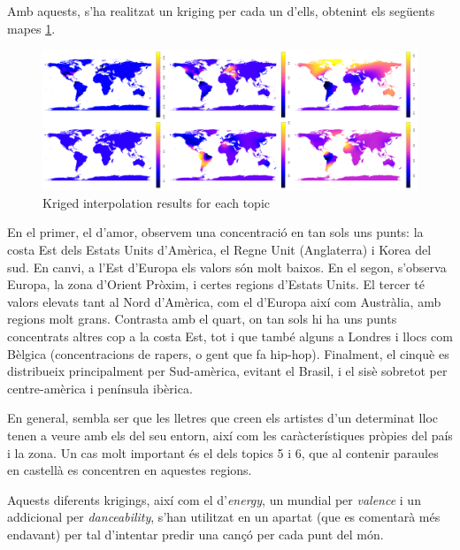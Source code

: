 Amb aquests, s'ha realitzat un kriging per cada un d'ells, obtenint els següents mapes \ref{fig:textual_kriging}.

\begin{figure}[H]
    \centering
    \includegraphics[width=0.75\linewidth]{Images//8_Textual//Geotextual/merged_topics_geotext.png}
    \caption{Kriged interpolation results for each topic}
    \label{fig:textual_kriging}
\end{figure}

En el primer, el d'amor, observem una concentració en tan sols uns punts: la costa Est dels Estats Units d'Amèrica, el Regne Unit (Anglaterra) i Korea del sud. En canvi, a l'Est d'Europa els valors són molt baixos. En el segon, s'observa Europa, la zona d'Orient Pròxim, i certes regions d'Estats Units. El tercer té valors elevats tant al Nord d'Amèrica, com el d'Europa així com Austràlia, amb regions molt grans. Contrasta amb el quart, on tan sols hi ha uns punts concentrats altres cop a la costa Est, tot i que també alguns a Londres i llocs com Bèlgica (concentracions de rapers, o gent que fa hip-hop). Finalment, el cinquè es distribueix principalment per Sud-amèrica, evitant el Brasil, i el sisè sobretot per centre-amèrica i península ibèrica.

En general, sembla ser que les lletres que creen els artistes d'un determinat lloc tenen a veure amb els del seu entorn, així com les caràcterístiques pròpies del país i la zona. Un cas molt important és el dels topics 5 i 6, que al contenir paraules en castellà es concentren en aquestes regions.

Aquests diferents krigings, així com el d'\textit{energy}, un mundial per \textit{valence} i un addicional per \textit{danceability}, s'han utilitzat en un apartat (que es comentarà més endavant) per tal d'intentar predir una cançó per cada punt del món.
